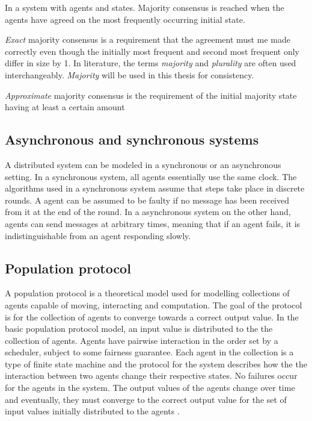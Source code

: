 \begin{definition}
In a system with  agents and  states. Majority consensus is reached when the agents have agreed on the most frequently occurring initial state. 
\end{definition}
 
 \emph{Exact} majority consensus is a requirement that the agreement must me made correctly even though the initially most frequent and second most frequent only differ in size by 1. In literature, the terms \emph{majority} and \emph{plurality} are often used interchangeably. \emph{Majority} will be used in this thesis for consistency.

\emph{Approximate} majority consensus is the requirement of the initial majority state having at least a certain amount 


\subsection{Asynchronous and synchronous systems}

A distributed system can be modeled in a synchronous or an asynchronous setting. In a synchronous system, all agents essentially use the same clock. The algorithms used in a synchronous system assume that steps take place in discrete rounds. A agent can be assumed to be faulty if no message has been received from it at the end of the round. In a asynchronous system on the other hand, agents can send messages at arbitrary times, meaning that if an agent fails, it is indistinguishable from an agent responding slowly.


\subsection{Population protocol}
 A population protocol is a theoretical model used for modelling collections of agents capable of moving, interacting and computation. The goal of the protocol is for the collection of agents to converge towards a correct output value. In the basic population protocol model, an input value is distributed to the the collection of agents. Agents have pairwise interaction in the order set by a scheduler, subject to some fairness guarantee. Each agent in the collection is a type of finite state machine and the protocol for the system describes how the the interaction between two agents change their respective states. No failures occur for the agents in the system. The output values of the agents change over time and eventually, they must converge to the correct output value for the set of input values initially distributed to the agents \cite{aspnesIntroductionPopulationProtocols2009}. 

